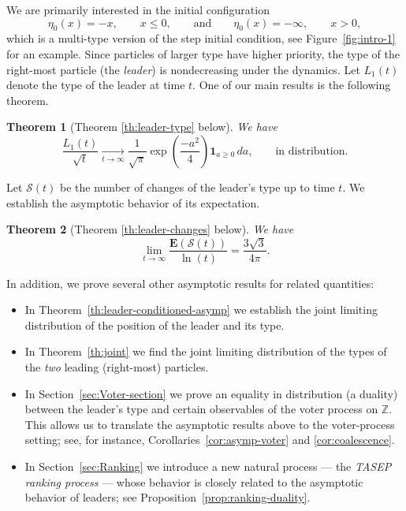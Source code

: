 \documentclass[11pt,reqno]{amsart}
\newtheorem{thm}{Theorem}[section]
\theoremstyle{definition}
\theoremstyle{remark}
\theoremstyle{remark}
\def\leq{\leqslant}
\def\geq{\geqslant}
\renewcommand\le{\leq}
\renewcommand\ge{\geq}
\numberwithin{equation}{section}
\begin{document}
	We are primarily interested in the initial configuration
	\[
	\eta_0(x)=-x,\qquad x\le 0,
	\qquad\text{and}\qquad
	\eta_0(x)=-\infty,\qquad x>0,
	\]
	which is a multi-type version of the step initial condition, see Figure~\ref{fig:intro-1} for an example. Since particles of larger type have higher priority, the type of the right-most particle (the \textit{leader}) is nondecreasing under the dynamics. Let $L_1(t)$ denote the type of the leader at time $t$. One of our main results is the following theorem.
	
	\begin{thm}[Theorem \ref{th:leader-type} below]
		We have
		$$
		\frac{L_1(t)}{\sqrt{t}} \xrightarrow[t \to \infty]{} \frac{1}{\sqrt{\pi}} \exp \left( \frac{-a^2}{4} \right) \mathbf{1}_{a \ge 0} \, da, \qquad \mbox{in distribution}.
		$$
	\end{thm}
	
	Let $\mathcal{S}(t)$ be the number of changes of the leader's type up to time $t$. We establish the asymptotic behavior of its expectation.
	
	\begin{thm}[Theorem \ref{th:leader-changes} below]
		We have
		$$
		\lim_{t \to \infty} \frac{ \mathbf{E} \left( \mathcal{S}(t) \right)}{\ln(t)} = \frac{3 \sqrt{3}}{4 \pi}.
		$$
	\end{thm}
	
	In addition, we prove several other asymptotic results for related quantities:
	
	\begin{itemize}
		\item In Theorem~\ref{th:leader-conditioned-asymp} we establish the joint limiting distribution of the position of the leader and its type.
		\item In Theorem~\ref{th:joint} we find the joint limiting distribution of the types of the \textit{two} leading (right-most) particles.
		\item In Section~\ref{sec:Voter-section} we prove an equality in distribution (a duality) between the leader's type and certain observables of the voter process on $\mathbb{Z}$. This allows us to translate the asymptotic results above to the voter-process setting; see, for instance, Corollaries~\ref{cor:asymp-voter} and \ref{cor:coalescence}.
		\item In Section~\ref{sec:Ranking} we introduce a new natural process --- the \textit{TASEP ranking process} --- whose behavior is closely related to the asymptotic behavior of leaders; see Proposition~\ref{prop:ranking-duality}.
	\end{itemize}
	
\end{document}
